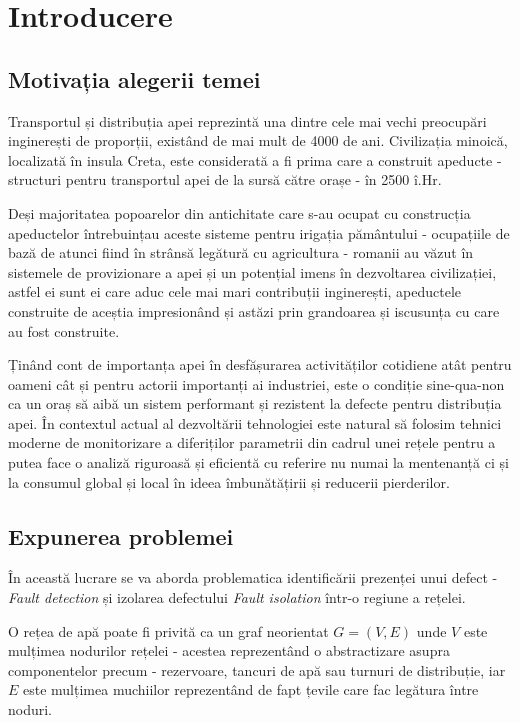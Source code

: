 \chapter{Introducere}
\label{chap:intro}

\section{Motivația alegerii temei}
Transportul și distribuția apei reprezintă una dintre cele mai vechi preocupări inginerești de proporții, existând de mai mult de 4000 de ani. Civilizația minoică, localizată în insula Creta, este considerată a fi prima care a construit apeducte - structuri pentru transportul apei de la sursă către orașe - în 2500 î.Hr. 

Deși majoritatea popoarelor din antichitate care s-au ocupat cu construcția apeductelor întrebuințau aceste sisteme pentru irigația pământului - ocupațiile de bază de atunci fiind în strânsă legătură cu agricultura - romanii au văzut în sistemele de provizionare a apei și un potențial imens în dezvoltarea civilizației, astfel ei sunt ei care aduc cele mai mari contribuții inginerești, apeductele construite de aceștia impresionând și astăzi prin grandoarea și iscusunța cu care au fost construite.

Ținând cont de importanța apei în desfășurarea activităților cotidiene atât pentru oameni cât și pentru actorii importanți ai industriei, este o condiție sine-qua-non ca un oraș să aibă un sistem performant și rezistent la defecte pentru distribuția apei. În contextul actual al dezvoltării tehnologiei este natural să folosim tehnici moderne de monitorizare a diferiților parametrii din cadrul unei rețele pentru a putea face o analiză riguroasă și eficientă cu referire nu numai la mentenanță ci și la consumul global și local în ideea îmbunătățirii și reducerii pierderilor.


\section{Expunerea problemei}

În această lucrare se va aborda problematica identificării prezenței unui defect - \textit{Fault detection} și izolarea defectului \textit{Fault isolation} într-o regiune a rețelei.

O rețea de apă poate fi privită ca un graf neorientat $G = (V, E)$ unde $V$ este mulțimea nodurilor rețelei - acestea reprezentând o abstractizare asupra componentelor precum - rezervoare, tancuri de apă sau turnuri de distribuție, iar $E$ este mulțimea muchiilor reprezentând de fapt țevile care fac legătura între noduri.

